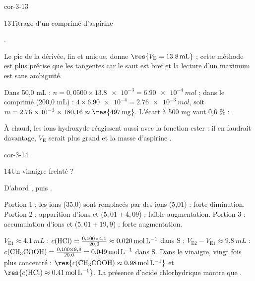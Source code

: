 \begin{blocLivre}{cor-3-13}
\begin{corrige}{13}{Titrage d'un comprimé d'aspirine}
\begin{questions}
\item {}.
\item Le pic de la dérivée, fin et unique, donne $\res{V_\mathrm{E}=\qty{13,8}{mL}}$ ; cette méthode est plus précise que
les tangentes car le saut est bref et la lecture d'un maximum est sans ambiguïté.
\item Dans 50,0 mL : $n=0{,}0500\times\num{13.8e-3}=\qty{6,90e-4}{mol}$ ; dans le comprimé (200,0 mL) :
$4\times\num{6.90e-4}=\qty{2,76e-3}{mol}$, soit $m=\num{2.76e-3}\times180{,}16\approx\res{\qty{497}{mg}}$. L'écart à 500 mg
vaut 0,6 \% : .
\item À chaud, les ions hydroxyde réagissent aussi avec la fonction ester : il en faudrait davantage,
$V_\mathrm{E}$ serait plus grand et la masse d'aspirine .
\end{questions}
\end{corrige}
\end{blocLivre}
\begin{blocLivre}{cor-3-14}
\begin{corrige}{14}{Un vinaigre frelaté ?}
\begin{questions}
\item D'abord , puis .
\item Portion 1 : les ions  (35,0) sont remplacés par des ions  (5,01) : forte diminution.
Portion 2 : apparition d'ions  et  ($5{,}01+4{,}09$) : faible augmentation.
Portion 3 : accumulation d'ions  et  ($5{,}01+19{,}9$) : forte augmentation.
\item $V_\mathrm{E1}\approx\qty{4,1}{mL}$ : $c(\ce{HCl})=\frac{0{,}100\times4{,}1}{20{,}0}\approx\qty{0,020}{mol.L^{-1}}$ dans S ;
$V_\mathrm{E2}-V_\mathrm{E1}\approx\qty{9,8}{mL}$ : $c(\ce{CH3COOH})=\frac{0{,}100\times9{,}8}{20{,}0}=\qty{0,049}{mol.L^{-1}}$ dans S.
Dans le vinaigre, vingt fois plus concentré : $\res{c(\ce{CH3COOH})\approx\qty{0,98}{mol.L^{-1}}}$ et
$\res{c(\ce{HCl})\approx\qty{0,41}{mol.L^{-1}}}$. La présence d'acide chlorhydrique montre que
.
\end{questions}
\end{corrige}
\end{blocLivre}
